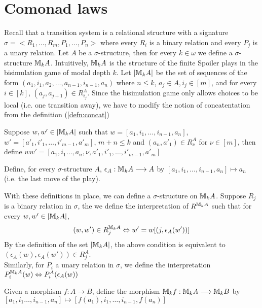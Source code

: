 \section{Comonad laws}
Recall that a transition system is a relational structure with a signature $\sigma = <R_{1},\dots,R_{m},P_{1},\dots,P_{n}>$ where every $R_{i}$ is a binary relation and every $P_{j}$ is a unary relation. Let $A$ be a $\sigma$-structure, then for every $k \in \omega$ we define a  $\sigma$-structure ${\mathbb{M}_{k}A}$. Intuitively, ${\mathbb{M}_{k}A}$ is the structure of the finite Spoiler plays in the bisimulation game of modal depth $k$. Let $|{\mathbb{M}_{k}A}|$ be the set of sequences of the form $(a_{1},i_{1},a_{2},\dots,a_{n-1},i_{n-1},a_{n})$ where $n \leq k$, $a_{j} \in A, i_{j} \in [m]$, and for every $i \in [k]$, $(a_{j},a_{j+1}) \in R^{A}_{i_{j}}$. Since the bisimulation game only allows choices to be local (i.e. one transition away), we have to modify the notion of concatentation from the definition (\ref{defn:concat}) 
\begin{defn}
Suppose $w,w' \in |{\mathbb{M}_{k}A}|$ such that $w = [a_{1},i_{1},\dots,i_{n-1},a_{n}]$, $w' = [a'_{1},i'_{1},\dots,i'_{m-1},a'_{m}]$, $m+n \leq k$ and $(a_{n},a'_{1}) \in R^{A}_{\nu}$ for $\nu \in [m]$, then define $ww' = [a_{1},i_{1}
\dots,a_{n},\nu,a'_{1},i'_{1},\dots,i'_{m-1},a'_{m}]$ 
\end{defn}
\begin{defn}
Define, for every $\sigma$-structure $A$, $\epsilon_{A}:{\mathbb{M}_{k}A} \longrightarrow A$ by $[a_{1},i_{1},\dots,i_{n-1},a_{n}] \mapsto a_{n}$ (i.e. the last move of the play). 
\label{defn:epsilon}
\end{defn}
With these definitions in place, we can define a $\sigma$-structure on ${\mathbb{M}_{k}A}$. Suppose $R_{j}$ is a binary relation in $\sigma$, the we define the interpretation of $R^{{\mathbb{M}_{k}A}}$ such that for every $w,w' \in |{\mathbb{M}_{k}A}|$,
\begin{equation}
(w,w') \in R^{{\mathbb{M}_{k}A}}_{j} \Leftrightarrow w' = w[(j,\epsilon_{A}(w'))] \label{eq:R}
\end{equation}
By the definition of the set $|{\mathbb{M}_{k}A}|$, the above condition is equivalent to $(\epsilon_{A}(w),\epsilon_{A}(w')) \in R^{A}_{j}$. \\
Similarly, for $P_{i}$ a unary relation in $\sigma$, we define the interpretation $P^{{\mathbb{M}_{k}A}}_{i}(w) \Leftrightarrow P^{A}_{i}(\epsilon_{A}(w))$
\begin{defn}
Given a morphism $f:A \longrightarrow B$, define the morphism ${\mathbb{M}_{k}f}:{\mathbb{M}_{k}A} \longrightarrow {\mathbb{M}_{k}B}$ by $[a_{1},i_{1}\dots,i_{n-1},a_{n}] \mapsto [f(a_{1}),i_{1},\dots,i_{n-1},f(a_{n})]$
\label{defn:mComonadMorphism}
\end{defn}
